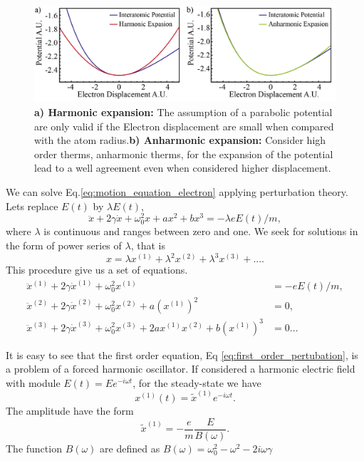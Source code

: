 \begin{figure}[h!]
    \centering
    \includegraphics[width = 16cm]{figuras/Dissertation_interatomic_expassion.jpg}
    \caption{\textbf{a) Harmonic expansion:} The assumption of a parabolic potential are only valid if the Electron displacement are small when compared with the atom radius.\textbf{b) Anharmonic expansion:} Consider high order therms, anharmonic therms, for the expansion of the potential lead to a well agreement even when considered higher displacement.}
    \label{fig:expanssion}
\end{figure}
We can solve Eq.\ref{eq:motion_equation_electron} applying perturbation theory. Lets replace $E(t)$ by $\lambda E(t)$, %
\begin{equation}
    \ddot{x} + 2\gamma\dot{x} + \omega_0^2x+ax^2+bx^3 = -\lambda eE(t)/m,
    \label{eq:pertubed_equation_electron}
\end{equation}
where $\lambda$ is continuous and ranges between zero and one. We seek for solutions in the form of power series of $\lambda$, that is 
\begin{equation}
    x = \lambda x^{(1)} + \lambda^2 x^{(2)} + \lambda^3 x^{(3)} +....
    \label{eq:x_pertubation_expanssion}
\end{equation}
This procedure give us a set of equations.
\begin{subequations}
    \begin{align}
        \ddot{x}^{(1)} + 2\gamma\dot{x}^{(1)} + \omega_0^2x^{(1)} &= -eE(t)/m,\label{eq:first_order_pertubation}\\
        \ddot{x}^{(2)} + 2\gamma\dot{x}^{(2)} + \omega_0^2x^{(2)}+a\left(x^{(1)}\right)^2 &= 0,\label{eq:second_order_pertubation}\\
        \ddot{x}^{(3)} + 2\gamma\dot{x}^{(3)} + \omega_0^2x^{(3)}+     2ax^{(1)}x^{(2)} +b\left(x^{(1)}\right)^3 &= 0\label{eq:thirdt_order_pertubation}...    
    \end{align}
\end{subequations}

It is easy to see that the first order equation, Eq \ref{eq:first_order_pertubation}, is a problem of a forced harmonic oscillator. If considered a harmonic electric field with module $E(t) = Ee^{-i\omega t}$, for the steady-state we have
\begin{equation}
    x^{(1)}(t) = \tilde{x}^{(1)}e^{-i\omega t}.
\end{equation}
The amplitude have the form
\begin{equation}
    \tilde{x}^{(1)} = -\frac{e}{m}\frac{E}{B(\omega)}.
\end{equation}
The function $B(\omega)$ are defined as $B(\omega) = \omega_0^2-\omega^2-2i\omega\gamma$

